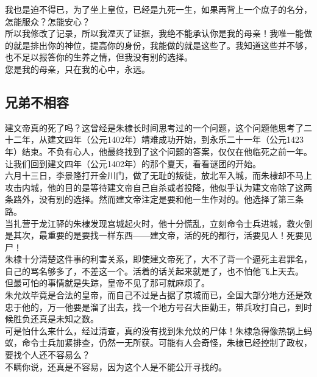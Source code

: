 \begin{multicols}{\theparacolNo}
我也是迫不得已，为了坐上皇位，已经是九死一生，如果再背上一个庶子的名分，怎能服众？怎能安心？\\

所以我修改了记录，所以我湮灭了证据，我绝不能承认你是我的母亲！我唯一能做的就是排出你的神位，提高你的身份，我能做的就是这些了。我知道这些并不够，也不足以报答你的生养之情，但我没有别的选择。\\

您是我的母亲，只在我的心中，永远。\\

\subsection{兄弟不相容}
建文帝真的死了吗？这曾经是朱棣长时间思考过的一个问题，这个问题他思考了二十二年，从建文四年（公元1402年）靖难成功开始，到永乐二十一年（公元1423年）结束。不负有心人，他最终找到了这个问题的答案，仅仅在他临死之前一年。\\

让我们回到建文四年（公元1402年）的那个夏天，看看谜团的开始。\\

六月十三日，李景隆打开金川门，做了无耻的叛徒，放北军入城，而朱棣却不马上攻击内城，他的目的是等待建文帝自己自杀或者投降，他似乎认为建文帝除了这两条路外，没有别的选择。然而建文帝注定是要和他一生作对的。他选择了第三条路。\\

当扎营于龙江驿的朱棣发现宫城起火时，他十分慌乱，立刻命令士兵进城，救火倒是其次，最重要的是要找一样东西——建文帝，活的死的都行，活要见人！死要见尸！\\

朱棣十分清楚这件事的利害关系，即使建文帝死了，大不了背一个逼死主君罪名，自己的骂名够多了，不差这一个。活着的话关起来就是了，也不怕他飞上天去。\\

但最可怕的事情就是失踪，皇帝不见了那可就麻烦了。\\

朱允炆毕竟是合法的皇帝，而自己不过是占据了京城而已，全国大部分地方还是效忠于他的，万一他要是溜了出去，找一个地方号召大臣勤王，带兵攻打自己，到时候胜负还真是未知之数。\\

可是怕什么来什么，经过清查，真的没有找到朱允炆的尸体！朱棣急得像热锅上蚂蚁，命令士兵加紧排查，仍然一无所获。可能有人会奇怪，朱棣已经控制了政权，要找个人还不容易么？\\

不瞒你说，还真是不容易，因为这个人是不能公开寻找的。\\


\end{multicols}
